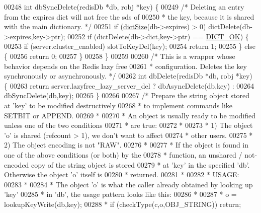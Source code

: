 \begin{DoxyCode}
00248 \textcolor{keywordtype}{int} dbSyncDelete(redisDb *db, robj *key) \{
00249     \textcolor{comment}{/* Deleting an entry from the expires dict will not free the sds of}
00250 \textcolor{comment}{     * the key, because it is shared with the main dictionary. */}
00251     \textcolor{keywordflow}{if} (\hyperlink{dict_8h_af193430dd3d5579a52b194512f72c1f0}{dictSize}(db->expires) > 0) dictDelete(db->expires,key->ptr);
00252     \textcolor{keywordflow}{if} (dictDelete(db->dict,key->ptr) == \hyperlink{dict_8h_a2afecbeab8f7efbc183048f52f6d17e5}{DICT\_OK}) \{
00253         \textcolor{keywordflow}{if} (server.cluster\_enabled) slotToKeyDel(key);
00254         \textcolor{keywordflow}{return} 1;
00255     \} \textcolor{keywordflow}{else} \{
00256         \textcolor{keywordflow}{return} 0;
00257     \}
00258 \}
00259 
00260 \textcolor{comment}{/* This is a wrapper whose behavior depends on the Redis lazy free}
00261 \textcolor{comment}{ * configuration. Deletes the key synchronously or asynchronously. */}
00262 \textcolor{keywordtype}{int} dbDelete(redisDb *db, robj *key) \{
00263     \textcolor{keywordflow}{return} server.lazyfree\_lazy\_server\_del ? dbAsyncDelete(db,key) :
00264                                              dbSyncDelete(db,key);
00265 \}
00266 
00267 \textcolor{comment}{/* Prepare the string object stored at 'key' to be modified destructively}
00268 \textcolor{comment}{ * to implement commands like SETBIT or APPEND.}
00269 \textcolor{comment}{ *}
00270 \textcolor{comment}{ * An object is usually ready to be modified unless one of the two conditions}
00271 \textcolor{comment}{ * are true:}
00272 \textcolor{comment}{ *}
00273 \textcolor{comment}{ * 1) The object 'o' is shared (refcount > 1), we don't want to affect}
00274 \textcolor{comment}{ *    other users.}
00275 \textcolor{comment}{ * 2) The object encoding is not "RAW".}
00276 \textcolor{comment}{ *}
00277 \textcolor{comment}{ * If the object is found in one of the above conditions (or both) by the}
00278 \textcolor{comment}{ * function, an unshared / not-encoded copy of the string object is stored}
00279 \textcolor{comment}{ * at 'key' in the specified 'db'. Otherwise the object 'o' itself is}
00280 \textcolor{comment}{ * returned.}
00281 \textcolor{comment}{ *}
00282 \textcolor{comment}{ * USAGE:}
00283 \textcolor{comment}{ *}
00284 \textcolor{comment}{ * The object 'o' is what the caller already obtained by looking up 'key'}
00285 \textcolor{comment}{ * in 'db', the usage pattern looks like this:}
00286 \textcolor{comment}{ *}
00287 \textcolor{comment}{ * o = lookupKeyWrite(db,key);}
00288 \textcolor{comment}{ * if (checkType(c,o,OBJ\_STRING)) return;}

\end{DoxyCode}

